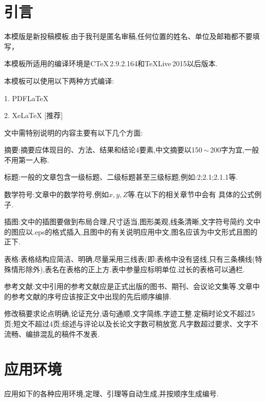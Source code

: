\documentclass{ctacn}%
\begin{document}

\maketitle




\begin{multicols}{2}
\section{引\quad  言}
本模版是新投稿模板.\;由于我刊是匿名审稿,任何位置的姓名、单位及邮箱都不要填写，

本模板所适用的编译环境是CTeX\,2.9.2.164和\linebreak TeXLive\,2015以后版本.

本模板可以使用以下两种方式编译:

 1. PDFLaTeX

2. XeLaTeX [推荐]


文中需特别说明的内容主要有以下几个方面:

摘要:摘要应体现目的、方法、结果和结论4要素,中文摘要以150\,$\sim$\,200字为宜,一般不用第一人称.

标题:一般的文章包含一级标题、二级标题甚至三级标题,例如:2;2.1;2.1.1等.

数学符号:文章中的数学符号,例如$x, y, Z$等.在以下的相关章节中会有
具体的公式例子.

插图:文中的插图要做到布局合理,尺寸适当,图形美观,线条清晰,文字符号简约.文中的图应以.eps的格式插入,且图中的有关说明应用中文,图名应该为中文形式且图的正下.

表格:表格结构应简洁、明确,尽量采用三线表(即:表格中没有竖线,只有三条横线(特殊情形除外),表名在表格的正上方.\;表中参量应标明单位.\;过长的表格可以通栏.

参考文献:文中引用的参考文献应是正式出版的图书、期刊、会议论文集等.\;文章中的参考文献的序号应该按正文中出现的先后顺序编排.


修改稿要求论点明确,论证充分,语句通顺,文字简练,字迹工整.定稿时论文不超过5页;短文不超过4页;综述与评论以及长论文字数可稍放宽.\;凡字数超过要求、文字不流畅、编排混乱的稿件不发表.

\section{应用环境}
应用如下的各种应用环境,定理、引理等自动生成,并按顺序生成编号.



\end{multicols}
\end{document}
